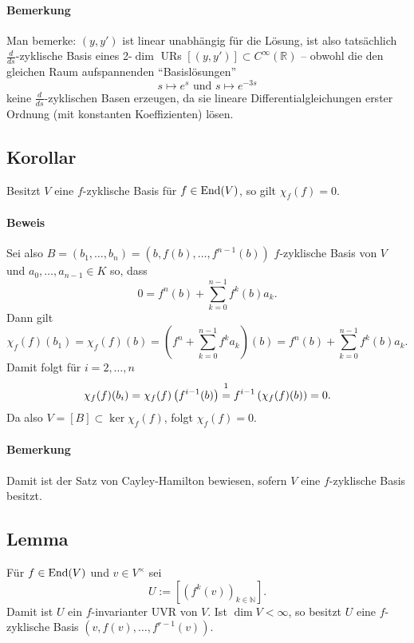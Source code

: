 \paragraph{Bemerkung}
	Man bemerke: $ (y,y') $ ist linear unabhängig für die Lösung, ist also tatsächlich $ \frac{d}{ds} $-zyklische Basis eines 2-$ \dim $ URs $ [(y,y')]\subset C^\infty(\mathbb{R}) $ -- obwohl die den gleichen Raum aufspannenden "`Basislösungen"'
		\[ s\mapsto e^s \text{ und } s\mapsto e^{-3s} \]
	keine $ \frac{d}{ds} $-zyklischen Basen erzeugen, da sie lineare Differentialgleichungen erster Ordnung (mit konstanten Koeffizienten) lösen.
\subsection{Korollar}
	Besitzt $ V $ eine $ f $-zyklische Basis für $ f\in\operatorname{End}(V) $, so gilt $ \chi_f(f)=0 $.
\paragraph{Beweis}
	Sei also $ B=(b_1,\dots,b_n) =(b,f(b),\dots,f^{n-1}(b)) $ $ f $-zyklische Basis von $ V $ und $ a_0,\dots,a_{n-1}\in K $ so, dass
		\[ 0 = f^n(b)+\sum_{k=0}^{n-1}f^k(b)a_k. \]
	Dann gilt
		\[ \chi_f(f)(b_1) = \chi_f(f)(b) = \left(f^n+\sum_{k=0}^{n-1}f^ka_k\right)(b) = f^n(b)+\sum_{k=0}^{n-1}f^k(b)a_k. \]
	Damit folgt für $ i=2,\dots,n $
		\[ \chi_f(f)(b_i) = \chi_f(f)\left(f^{i-1}(b)\right) \overset{\footnotemark}{=} f^{i-1}\left(\chi_f(f)(b) \right) = 0. \]
	Da also $ V=[B] \subset \ker {\chi_f(f)}$, folgt $ \chi_f(f) = 0. $
\paragraph{Bemerkung}
	Damit ist der Satz von Cayley-Hamilton bewiesen, sofern $ V $ eine $ f $-zyklische Basis besitzt.
\subsection{Lemma}
	Für $ f\in\operatorname{End}(V) $ und $ v\in V^\times  $ sei
		\[ U := \left[\left(f^k(v)\right)_{k\in{\mathbb{N}}}\right]. \]
	Damit ist $ U $ ein $ f $-invarianter UVR von $ V $. Ist $ \dim V < \infty $, so besitzt $ U $ eine $ f $-zyklische Basis $ \left(v,f(v),\dots,f^{r-1}(v)\right) $.
	
